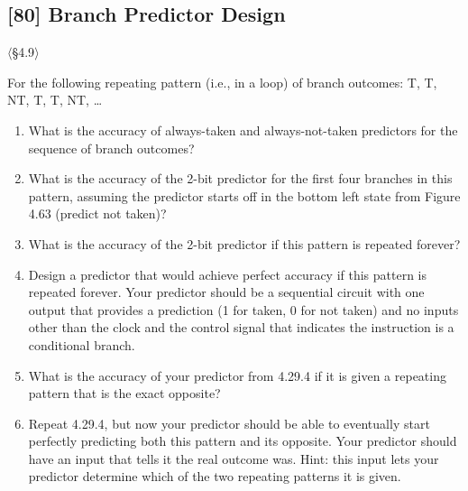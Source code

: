 \problembreak

\subsection{[80] Branch Predictor Design}
\hypertarget{prob-4.29}{}
\noindent$\langle$\S4.9$\rangle$\medskip

\noindent For the following repeating pattern (i.e., in a loop) of branch
outcomes: T, T, NT, T, T, NT, \ldots

\begin{enumerate}
  \item[4.29.1] [5] What is the accuracy of always-taken and
        always-not-taken predictors for the sequence of branch outcomes?
  \item[4.29.2] [5] What is the accuracy of the 2-bit predictor for the
        first four branches in this pattern, assuming the predictor starts
        off in the bottom left state from Figure 4.63 (predict not taken)?
  \item[4.29.3] [10] What is the accuracy of the 2-bit predictor if this
        pattern is repeated forever?
  \item[4.29.4] [30] Design a predictor that would achieve perfect accuracy
        if this pattern is repeated forever. Your predictor should be a
        sequential circuit with one output that provides a prediction (1 for
        taken, 0 for not taken) and no inputs other than the clock and the
        control signal that indicates the instruction is a conditional branch.
  \item[4.29.5] [10] What is the accuracy of your predictor from 4.29.4 if
        it is given a repeating pattern that is the exact opposite?
  \item[4.29.6] [20] Repeat 4.29.4, but now your predictor should be able to
        eventually start perfectly predicting both this pattern and its
        opposite. Your predictor should have an input that tells it the real
        outcome was. Hint: this input lets your predictor determine which of
        the two repeating patterns it is given.
\end{enumerate}

